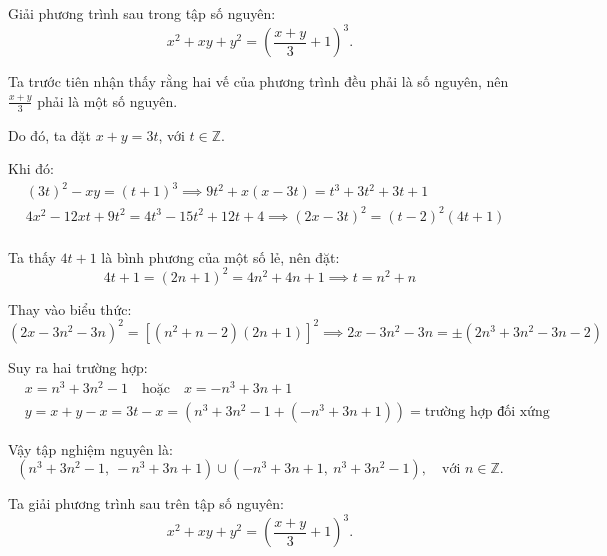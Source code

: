 \ifshowproblemandsoln
\ifshowproblem\begin{problem}\label{problem:USA-2015-JMO-P2}\fi
\ifshowsoln\begin{problem}\fi
    Giải phương trình sau trong tập số nguyên:
    \[
        x^2 + xy + y^2 = \left( \frac{x + y}{3} + 1 \right)^3.
    \]
\end{problem}
\fi

\ifshowsoln
\begin{soln}\footnotemark
    Ta trước tiên nhận thấy rằng hai vế của phương trình đều phải là số nguyên, nên \( \frac{x + y}{3} \) phải là một số nguyên.

    Do đó, ta đặt \( x + y = 3t \), với \( t \in \mathbb{Z} \).

    Khi đó:
    \[
        \begin{aligned}
            &(3t)^2 - xy = (t + 1)^3 \implies 9t^2 + x(x - 3t) = t^3 + 3t^2 + 3t + 1\\
            &4x^2 - 12xt + 9t^2 = 4t^3 - 15t^2 + 12t + 4 \implies (2x - 3t)^2 = (t - 2)^2(4t + 1)\\
        \end{aligned}
    \]
    
    Ta thấy \( 4t + 1 \) là bình phương của một số lẻ, nên đặt:
    \[
        4t + 1 = (2n + 1)^2 = 4n^2 + 4n + 1 \implies t = n^2 + n
    \]

    Thay vào biểu thức:
    \[
        (2x - 3n^2 - 3n)^2 = [(n^2 + n - 2)(2n + 1)]^2 \implies 2x - 3n^2 - 3n = \pm (2n^3 + 3n^2 - 3n - 2)
    \]

    Suy ra hai trường hợp:
    \[
        \begin{aligned}
            &x = n^3 + 3n^2 - 1 \quad \text{hoặc} \quad x = -n^3 + 3n + 1\\
            &y = x + y - x = 3t - x = (n^3 + 3n^2 - 1 + (-n^3 + 3n + 1)) = \text{trường hợp đối xứng}
        \end{aligned}
    \]

    Vậy tập nghiệm nguyên là:
    \[
        \left( n^3 + 3n^2 - 1,\ -n^3 + 3n + 1 \right)
        \cup
        \left( -n^3 + 3n + 1,\ n^3 + 3n^2 - 1 \right),
        \quad \text{với } n \in \mathbb{Z}.
    \]
\end{soln}

\begin{soln}\footnotemark
    Ta giải phương trình sau trên tập số nguyên:
    \[
        x^2 + xy + y^2 = \left( \frac{x + y}{3} + 1 \right)^3.
    \]


\end{soln}
\end{problem}
